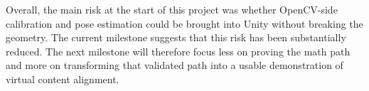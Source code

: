 \documentclass[10pt,twocolumn,letterpaper]{article}
\begin{document}
Overall, the main risk at the start of this project was whether OpenCV-side calibration and pose estimation could be brought into Unity without breaking the geometry. The current milestone suggests that this risk has been substantially reduced. The next milestone will therefore focus less on proving the math path and more on transforming that validated path into a usable demonstration of virtual content alignment.
\end{document}
